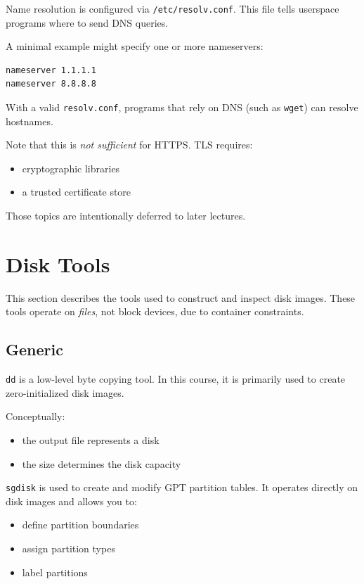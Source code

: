 \documentclass{../juni}
\begin{document}
Name resolution is configured via \texttt{/etc/resolv.conf}. This file tells
userspace programs where to send DNS queries.

A minimal example might specify one or more nameservers:
\begin{verbatim}
nameserver 1.1.1.1
nameserver 8.8.8.8
\end{verbatim}

With a valid \texttt{resolv.conf}, programs that rely on DNS (such as
\texttt{wget}) can resolve hostnames.

Note that this is \emph{not sufficient} for HTTPS. TLS requires:
\begin{itemize}
  \item cryptographic libraries
  \item a trusted certificate store
\end{itemize}

Those topics are intentionally deferred to later lectures.

\newpage

\section{Disk Tools}

This section describes the tools used to construct and inspect disk images.
These tools operate on \emph{files}, not block devices, due to container
constraints.

\subsection{Generic}

\texttt{dd} is a low-level byte copying tool. In this course, it is primarily
used to create zero-initialized disk images.

Conceptually:
\begin{itemize}
  \item the output file represents a disk
  \item the size determines the disk capacity
\end{itemize}

\texttt{sgdisk} is used to create and modify GPT partition tables. It operates
directly on disk images and allows you to:
\begin{itemize}
  \item define partition boundaries
  \item assign partition types
  \item label partitions
\end{itemize}
\end{document}
